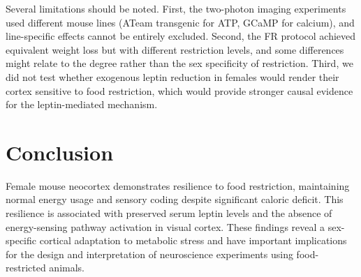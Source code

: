 \documentclass[11pt]{article}
\begin{document}
Several limitations should be noted. First, the two-photon imaging experiments used different mouse lines (ATeam transgenic for ATP, GCaMP for calcium), and line-specific effects cannot be entirely excluded. Second, the FR protocol achieved equivalent weight loss but with different restriction levels, and some differences might relate to the degree rather than the sex specificity of restriction. Third, we did not test whether exogenous leptin reduction in females would render their cortex sensitive to food restriction, which would provide stronger causal evidence for the leptin-mediated mechanism.

\section{Conclusion}

Female mouse neocortex demonstrates resilience to food restriction, maintaining normal energy usage and sensory coding despite significant caloric deficit. This resilience is associated with preserved serum leptin levels and the absence of energy-sensing pathway activation in visual cortex. These findings reveal a sex-specific cortical adaptation to metabolic stress and have important implications for the design and interpretation of neuroscience experiments using food-restricted animals.



\end{document}
